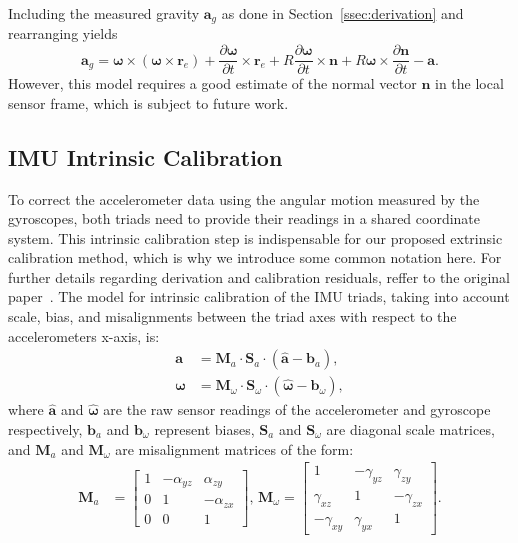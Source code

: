 \documentclass[journal]{IEEEtran}
\renewcommand{\vec}[1]{\boldsymbol{#1}}
\begin{document}
Including the measured gravity $\vec{a}_g$ as done in Section~\ref{ssec:derivation} and rearranging yields
\begin{equation}
  \vec{a}_g = \vec{\omega} \!\times\! \left( \vec{\omega} \!\times\! \vec{r}_e \right) +  \frac{\partial \vec{\omega}}{\partial t} \!\times\! \vec{r}_e + R \frac{\partial \vec{\omega}}{\partial t} \!\times\! \vec{n} + R \vec{\omega} \!\times\! \frac{\partial \vec{n}}{\partial t} - \vec{a} .
\end{equation}
However, this model requires a good estimate of the normal vector $\vec{n}$ in the local sensor frame, which is subject to future work.

\subsection{IMU Intrinsic Calibration}
To correct the accelerometer data using the angular motion measured by the gyroscopes, both triads need to provide their readings in a shared coordinate system.
This intrinsic calibration step is indispensable for our proposed extrinsic calibration method, which is why we introduce some common notation here.
For further details regarding derivation and calibration residuals, reffer to the original paper~\cite{imutk2014}. 
The model for intrinsic calibration of the IMU triads, taking into account scale, bias, and misalignments between the triad axes with respect to the accelerometers x-axis, is:
\begin{align}
  \vec{a} &= \mathbf{M}_a \cdot \mathbf{S}_a \cdot \left( \hat{\vec{a}} - \vec{b}_a\right), \\
  \vec{\omega} &= \mathbf{M}_\omega \cdot \mathbf{S}_\omega \cdot \left( \hat{\vec{\omega}} - \vec{b}_\omega\right),
\end{align}
where $\hat{\vec{a}}$ and $\hat{\vec{\omega}}$ are the raw sensor readings of the accelerometer and gyroscope respectively, $\vec{b}_a$ and $\vec{b}_\omega$ represent biases, $\mathbf{S}_a$ and $\mathbf{S}_\omega$ are diagonal scale matrices, and $\mathbf{M}_a$ and $\mathbf{M}_\omega$ are misalignment matrices of the form:
\begin{align}
  \mathbf{M}_a &= \begin{bmatrix} 1 & -\alpha_{yz} & \alpha_{zy} \\ 0 & 1 & -\alpha_{zx} \\ 0 & 0 & 1 \end{bmatrix},\,
  \mathbf{M}_\omega = \begin{bmatrix} 1 & -\gamma_{yz} & \gamma_{zy} \\ \gamma_{xz} & 1 & -\gamma_{zx} \\ -\gamma_{xy} & \gamma_{yx} & 1 \end{bmatrix}. \nonumber
\end{align}
\end{document}
